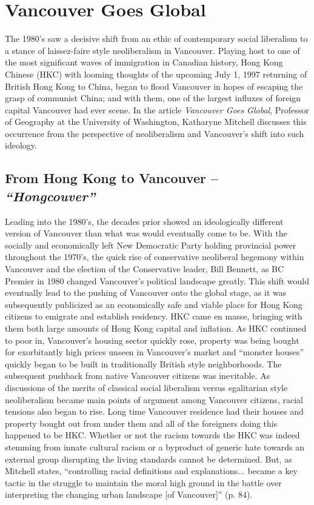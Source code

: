 \documentclass[man,donotrepeattitle,letter]{apa6}
\begin{document}
\section{Vancouver Goes Global}
The 1980's saw a decisive shift from an ethic of contemporary social liberalism to a stance of laissez-faire style neoliberalism in Vancouver.  Playing host to one of the most significant waves of immigration in Canadian history, Hong Kong Chinese (HKC) with looming thoughts of the upcoming July 1, 1997 returning of British Hong Kong to China, began to flood Vancouver in hopes of escaping the grasp of communist China; and with them, one of the largest influxes of foreign capital Vancouver had ever scene. In the article \textit{Vancouver Goes Global}, Professor of Geography at the University of Washington, Katharyne Mitchell discusses this occurrence from the perspective of neoliberalism and Vancouver's shift into such ideology.

\subsection{From Hong Kong to Vancouver -- \textit{``Hongcouver''}}
Leading into the 1980's, the decades prior showed an ideologically different version of Vancouver than what was would eventually come to be.  With the socially and economically left New Democratic Party holding provincial power throughout the 1970's, the quick rise of conservative neoliberal hegemony within Vancouver and the election of the Conservative leader, Bill Bennett, as BC Premier in 1980 changed Vancouver's political landscape greatly. This shift would eventually lead to the pushing of Vancouver onto the global stage, as it was subsequently publicized as an economically safe and viable place for Hong Kong citizens to emigrate and establish residency. HKC came en masse, bringing with them both large amounts of Hong Kong capital and inflation.  As HKC continued to poor in, Vancouver's housing sector quickly rose, property was being bought for exorbitantly high prices unseen in Vancouver's market and ``monster houses'' quickly began to be built in traditionally British style neighborhoods.  The subsequent pushback from native Vancouver citizens was inevitable.  As discussions of the merits of classical social liberalism versus egalitarian style neoliberalism became main points of argument among Vancouver citizens, racial tensions also began to rise. Long time Vancouver residence had their houses and property bought out from under them and all of the foreigners doing this happened to be HKC.  Whether or not the racism towards the HKC was indeed stemming from innate cultural racism or a byproduct of generic hate towards an external group disrupting the living standards cannot be determined. But, as Mitchell states, ``controlling racial definitions and explanations... became a key tactic in the struggle to maintain the moral high ground in the battle over interpreting the changing urban landscape [of Vancouver]'' (p. 84).
\end{document}
